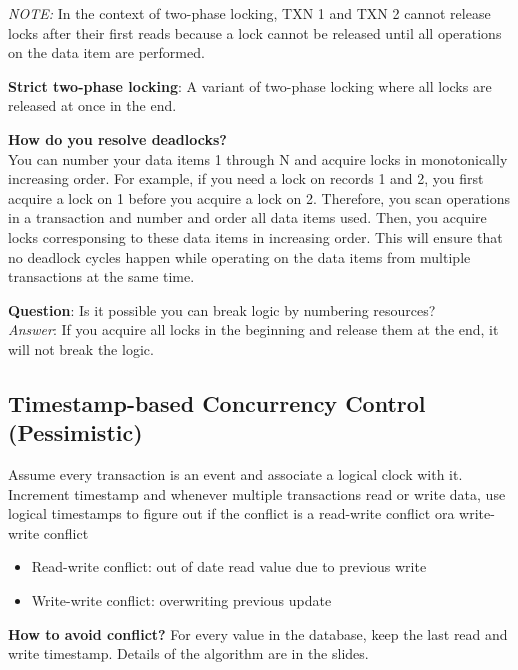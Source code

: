 \documentclass[twoside]{article}
\begin{document}
\emph{NOTE:} In the context of two-phase locking, TXN 1 and TXN 2 cannot release locks after their first reads because a lock cannot be released until all operations on the data item are performed.

\textbf{Strict two-phase locking}: A variant of two-phase locking where all locks are released at once in the end.

\textbf{How do you resolve deadlocks?}\\
You can number your data items 1 through N and acquire locks in monotonically increasing order. For example, if you need a lock on records 1 and 2, you first acquire a lock on 1 before you acquire a lock on 2. Therefore, you scan operations in a transaction and number and order all data items used. Then, you acquire locks corresponsing to these data items in increasing order. This will ensure that no deadlock cycles happen while operating on the data items from multiple transactions at the same time.

\textbf{Question}: Is it possible you can break logic by numbering resources?\\
\emph{Answer}: If you acquire all locks in the beginning and release them at the end, it will not break the logic.

\subsection{Timestamp-based Concurrency Control (Pessimistic)}

Assume every transaction is an event and associate a logical clock with it. Increment timestamp and whenever multiple transactions read or write data, use logical timestamps to figure out if the conflict is a read-write conflict ora write-write conflict

\begin{itemize}
\item{Read-write conflict: out of date read value due to previous write}
\item{Write-write conflict: overwriting previous update}
\end{itemize}

\textbf{How to avoid conflict?}
For every value in the database, keep the last read and write timestamp.
Details of the algorithm are in the slides.
\end{document}
